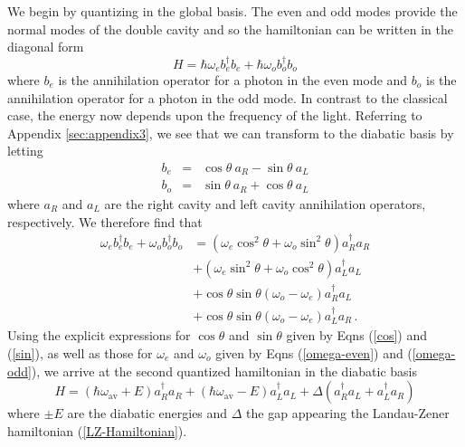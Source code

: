 \documentclass[twocolumn,english,pra,aps,superscriptaddress,floatfix]{revtex4-1}
\begin{document}
We begin by quantizing in the global basis. The even and odd modes provide the normal modes of the double cavity and so the hamiltonian can be written in the diagonal form
\begin{equation}
H=\hbar \omega_{e}b_{e}^{\dagger}b_{e}+\hbar \omega_{o}b_{o}^{\dagger}b_{o}
\label{Quantum Hamiltonian}
\end{equation}
where $b_{e}$ is the annihilation operator for a photon in the even mode and $b_{o}$ is the annihilation operator for a photon in the odd mode. In contrast to the classical case, the energy now depends upon the frequency of the light. Referring to Appendix \ref{sec:appendix3}, we see that we can transform to the diabatic basis by letting
\begin{eqnarray}
b_{e} & = & \cos \theta \ a_{R}-\sin \theta \ a_{L} \label{eq:photontransforme} \\
b_{o} & = & \sin \theta \ a_{R}+\cos \theta \ a_{L} \label{eq:photontransformo} 
\end{eqnarray}
where $a_{R}$ and $a_{L}$ are the right cavity and left cavity annihilation operators, respectively. We therefore find that
\begin{equation}
\begin{split}
\omega_{e}b_{e}^{\dagger}b_{e} +\omega_{o}b_{o}^{\dagger}b_{o} & =  (\omega_{e}\cos^{2}\theta+\omega_{o}\sin^{2}\theta)a_{R}^{\dagger}a_{R}\\
& +(\omega_{e}\sin^{2}\theta+\omega_{o}\cos^{2}\theta)a_{L}^{\dagger}a_{L}\\ &+\cos\theta\sin\theta(\omega_{o}-\omega_{e})a_{R}^{\dagger}a_{L}\\
& +\cos\theta\sin\theta(\omega_{o}-\omega_{e})a_{L}^{\dagger}a_{R} \, .
\end{split}
\end{equation}
Using the explicit expressions for $\cos \theta$ and $\sin \theta$ given by Eqns (\ref{cos}) and (\ref{sin}), as well as those for $\omega_{e}$ and $\omega_{o}$ given by Eqns (\ref{omega-even}) and (\ref{omega-odd}), we arrive at the second quantized hamiltonian in the diabatic basis
\begin{equation}
H=(\hbar \omega_{\mathrm{av}}+E)a_{R}^{\dagger}a_{R}+(\hbar \omega_{\mathrm{av}}-E)a_{L}^{\dagger}a_{L}+\Delta(a_{R}^{\dagger}a_{L}+a_{L}^{\dagger}a_{R})
\label{Quantum Hamiltonian 4}
\end{equation}
where $\pm E$ are the diabatic energies and $\Delta$ the gap appearing the Landau-Zener hamiltonian (\ref{LZ-Hamiltonian}).
\end{document}
